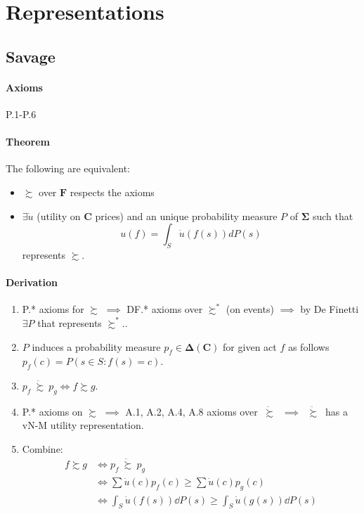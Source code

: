 \documentclass[landscape, 12pt]{extarticle}
\newcommand{\ddsuccsim}{\ \ddot \succsim \ }
\begin{document}
\clearpage

\section{Representations}

\begin{multicols}{2}
	\subsection{Savage}

	\paragraph{Axioms} P.1-P.6

	\paragraph{Theorem} The following are equivalent:
	\begin{itemize}
		\item $\succsim$ over $\bm F$ respects the axioms
		\item $\exists \dot u$ (utility on $\bm C$ prices) and
		      an unique probability measure $P$ of $\bm \Sigma$
		      such that
		      \[
			      u(f) = \int_S \dot u(f(s)) dP(s)
		      \]
		      represents $\succsim$.
	\end{itemize}

	\paragraph{Derivation}
	\begin{enumerate}
		\item P.* axioms for $\succsim$ $\implies$ DF.* axioms over $\succsim^*$ (on events)
		      $\implies$ by De Finetti $\exists P$ that represents $\succsim^*$..
		\item $P$ induces a probability measure $p_f \in \bm \Delta(\bm C)$ for  given act $f$
		      as follows $p_f(c) = P(s \in S : f(s) = c)$.
		\item $p_f \ddsuccsim p_g \iff f \succsim g$.
		\item P.* axioms on $\succsim$ $\implies$ A.1, A.2, A.4, A.8 axioms over $\ddsuccsim$ $\implies$
		      $\ddsuccsim$ has a vN-M utility representation.
		\item Combine:
		      \begin{align*}
			      f \succsim g & \iff p_f \ddsuccsim p_g                                             \\
			                   & \iff \sum \dot u(c)p_f(c) \geq \sum \dot u(c)p_g(c)                 \\
			                   & \iff \int_S \dot u(f(s)) \dd P(s) \geq \int_S \dot u(g(s)) \dd P(s)
		      \end{align*}
	\end{enumerate}


\end{multicols}
\end{document}
